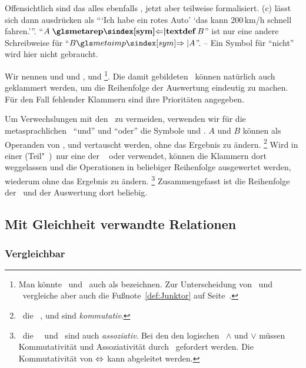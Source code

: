 Offensichtlich sind das alles ebenfalls \Aussagen, jetzt aber teilweise formalisiert.
(c) lässt sich dann ausdrücken als \enquote{\enquote{Ich habe ein rotes Auto} \symmetaand \enquote{das kann 200\,km/h schnell fahren.}}.
\enquote{$A \opdefinition{\symmetarep} B$} ist nur eine andere Schreibweise für \enquote{$B \symmetaimp A$}.
-- Ein Symbol für \enquote{nicht} wird hier nicht gebraucht.

Wir nennen  und   und ,  und  %
\footnote{%
	Man könnte \Metaoperationen\ und \Metarelationen\ auch als  bezeichnen. Zur Unterscheidung von \Operationen\ und \Relationen\ vergleiche aber auch die Fußnote~\ref{def:Junktor} auf Seite~\pageref{def:Junktor}.
}.
Die damit gebildeten \Aussagen\ können natürlich auch geklammert werden, um die Reihenfolge der Auswertung eindeutig zu machen.
Für den Fall fehlender Klammern sind ihre Prioritäten  angegeben.

Um Verwechslungen mit den \Junktoren\ zu vermeiden, verwenden wir für die metasprachlichen \Operationen\ \enquote{und} und \enquote{oder} die Symbole \chrqt{\symmetaand} und \chrqt{\symmetaor}.
$A$ und $B$ können als Operanden von \chrqt{\symmetaequiv}, \chrqt{\symmetaand} und \chrqt{\symmetaor} vertauscht werden, ohne das Ergebnis zu ändern.%
\footnote{%
	\textDh\ die \Operationen\ \chrqt{\symmetaequiv}, \chrqt{\symmetaand} und \chrqt{\symmetaor} sind \emph{kommutativ}.
}
Wird in einer (Teil"~)\Aussage\ nur eine der \Operationen\  oder  verwendet, können die Klammern dort weggelassen und die Operationen in beliebiger Reihenfolge ausgewertet werden, wiederum ohne das Ergebnis zu ändern.%
\footnote{%
	\textDh\ die \Operationen\ \symmetaand\ und \symmetaor\ sind auch \emph{assoziativ}.
	Bei den den logischen \Operationen\ $\land$ und $\lor$ müssen Kommutativität und Assoziativität durch \Axiome\ gefordert werden.
	Die Kommutativität von $\Leftrightarrow$ kann abgeleitet werden.
}
Zusammengefasst ist die Reihenfolge der \Operationen\ und der Auswertung dort beliebig.

\subsection{Mit Gleichheit verwandte Relationen}%
\label{sub:Gleichheit}

\subsubsection{Vergleichbar}%
\label{subsub:Vergleichbar}


